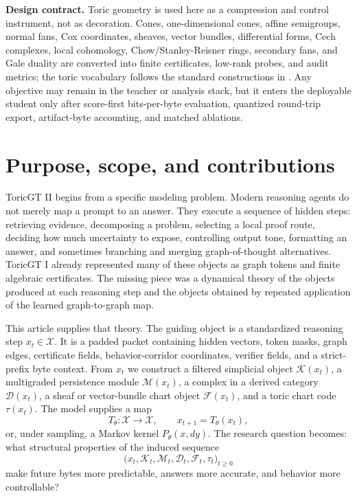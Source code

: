 \documentclass[10pt]{article}
\newcommand{\calX}{\mathcal{X}}
\newcommand{\calK}{\mathcal{K}}
\newcommand{\calM}{\mathcal{M}}
\newcommand{\calD}{\mathcal{D}}
\newcommand{\calF}{\mathcal{F}}
\numberwithin{equation}{section}
\begin{document}
\begin{titlepage}
\begin{abstract}
\end{abstract}
\vfill
\begin{minipage}{0.9\textwidth}
\textbf{Design contract.} Toric geometry is used here as a compression and control instrument, not as decoration. Cones, one-dimensional cones, affine semigroups, normal fans, Cox coordinates, sheaves, vector bundles, differential forms, Cech complexes, local cohomology, Chow/Stanley-Reisner rings, secondary fans, and Gale duality are converted into finite certificates, low-rank probes, and audit metrics; the toric vocabulary follows the standard constructions in \cite{cls}. Any objective may remain in the teacher or analysis stack, but it enters the deployable student only after score-first bits-per-byte evaluation, quantized round-trip export, artifact-byte accounting, and matched ablations.
\end{minipage}
\end{titlepage}
\tableofcontents
\clearpage

\section{Purpose, scope, and contributions}
ToricGT II begins from a specific modeling problem. Modern reasoning agents do not merely map a prompt to an answer. They execute a sequence of hidden steps: retrieving evidence, decomposing a problem, selecting a local proof route, deciding how much uncertainty to expose, controlling output tone, formatting an answer, and sometimes branching and merging graph-of-thought alternatives. ToricGT I already represented many of these objects as graph tokens and finite algebraic certificates. The missing piece was a dynamical theory of the objects produced at each reasoning step and the objects obtained by repeated application of the learned graph-to-graph map.

This article supplies that theory. The guiding object is a standardized reasoning step $x_t\in \calX$. It is a padded packet containing hidden vectors, token masks, graph edges, certificate fields, behavior-corridor coordinates, verifier fields, and a strict-prefix byte context. From $x_t$ we construct a filtered simplicial object $\calK(x_t)$, a multigraded persistence module $\calM(x_t)$, a complex in a derived category $\calD(x_t)$, a sheaf or vector-bundle chart object $\calF(x_t)$, and a toric chart code $\tau(x_t)$. The model supplies a map
\begin{equation}
T_\theta:\calX\to\calX,\qquad x_{t+1}=T_\theta(x_t),
\end{equation}
or, under sampling, a Markov kernel $P_\theta(x,dy)$. The research question becomes: what structural properties of the induced sequence
\begin{equation}
\bigl(x_t,\calK_t,\calM_t,\calD_t,\calF_t,\tau_t\bigr)_{t\ge 0}
\end{equation}
make future bytes more predictable, answers more accurate, and behavior more controllable?
\end{document}
